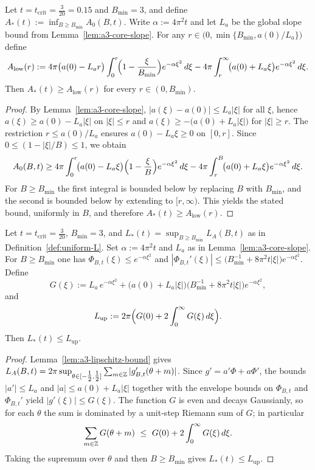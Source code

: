 \begin{lemma}\label{lem:digamma-mean-bound}
Let $t=t_{\mathrm{crit}}=\frac{3}{20}=0.15$ and $B_{\min}=3$, and define
\(
  A_*(t):=\inf_{B\ge B_{\min}} A_0(B,t).
\)
Write $\alpha:=4\pi^2 t$ and let $L_a$ be the global slope bound from Lemma~\ref{lem:a3-core-slope}.
For any $r\in\bigl(0,\min\{B_{\min},a(0)/L_a\}\bigr)$ define
\[
  A_{\mathrm{low}}(r)
  := 4\pi\bigl(a(0)-L_a r\bigr)\int_{0}^{r}\!\Bigl(1-\frac{\xi}{B_{\min}}\Bigr)e^{-\alpha \xi^2}\,d\xi
     - 4\pi\int_{r}^{\infty}\!\bigl(a(0)+L_a \xi\bigr)e^{-\alpha \xi^2}\,d\xi.
\]
Then $A_*(t)\ge A_{\mathrm{low}}(r)$ for every $r\in(0,B_{\min})$.
\end{lemma}

\begin{proof}
By Lemma~\ref{lem:a3-core-slope}, $|a(\xi)-a(0)|\le L_a|\xi|$ for all $\xi$, hence
$a(\xi)\ge a(0)-L_a|\xi|$ on $|\xi|\le r$ and $a(\xi)\ge -\bigl(a(0)+L_a|\xi|\bigr)$ for $|\xi|\ge r$.
The restriction $r\le a(0)/L_a$ ensures $a(0)-L_a\xi\ge0$ on $[0,r]$. Since $0\le (1-|\xi|/B)\le 1$, we obtain
\[
  A_0(B,t)
  \ge 4\pi\int_{0}^{r}\!\bigl(a(0)-L_a\xi\bigr)\Bigl(1-\frac{\xi}{B}\Bigr)e^{-\alpha \xi^2}\,d\xi
     - 4\pi\int_{r}^{B}\!\bigl(a(0)+L_a\xi\bigr)e^{-\alpha \xi^2}\,d\xi.
\]
For $B\ge B_{\min}$ the first integral is bounded below by replacing $B$ with $B_{\min}$,
and the second is bounded below by extending to $[r,\infty)$. This yields the stated bound,
uniformly in $B$, and therefore $A_*(t)\ge A_{\mathrm{low}}(r)$.
\end{proof}

\begin{lemma}\label{lem:digamma-lip-bound}
Let $t=t_{\mathrm{crit}}=\frac{3}{20}$, $B_{\min}=3$, and $L_*(t)=\sup_{B\ge B_{\min}} L_A(B,t)$ as in Definition~\ref{def:uniform-L}.
Set $\alpha:=4\pi^2 t$ and $L_a$ as in Lemma~\ref{lem:a3-core-slope}. For $B\ge B_{\min}$ one has
$\Phi_{B,t}(\xi)\le e^{-\alpha\xi^2}$ and
$
|\Phi_{B,t}'(\xi)|
\le \bigl(B_{\min}^{-1}+8\pi^2 t|\xi|\bigr)e^{-\alpha\xi^2}.
$
Define
\[
  G(\xi)
  := L_a\,e^{-\alpha\xi^2}
     + \bigl(a(0)+L_a|\xi|\bigr)\bigl(B_{\min}^{-1}+8\pi^2 t|\xi|\bigr)e^{-\alpha\xi^2},
\]
and
\[
  L_{\mathrm{up}}
  := 2\pi\Bigl(G(0) + 2\int_{0}^{\infty} G(\xi)\,d\xi\Bigr).
\]
Then $L_*(t)\le L_{\mathrm{up}}$.
\end{lemma}

\begin{proof}
Lemma~\ref{lem:a3-lipschitz-bound} gives
$L_A(B,t)=2\pi\sup_{\theta\in[-\tfrac12,\tfrac12]}\sum_{m\in\mathbb Z}|g_{B,t}'(\theta+m)|$.
Since $g'=a'\Phi+a\Phi'$, the bounds $|a'|\le L_a$ and $|a|\le a(0)+L_a|\xi|$ together with the
envelope bounds on $\Phi_{B,t}$ and $\Phi_{B,t}'$ yield $|g'(\xi)|\le G(\xi)$.
The function $G$ is even and decays Gaussianly, so for each $\theta$
the sum is dominated by a unit-step Riemann sum of $G$; in particular
\[
  \sum_{m\in\ZZ} G(\theta+m)\ \le\ G(0) + 2\int_{0}^{\infty} G(\xi)\,d\xi.
\]
Taking the supremum over $\theta$ and then $B\ge B_{\min}$ gives $L_*(t)\le L_{\mathrm{up}}$.
\end{proof}

